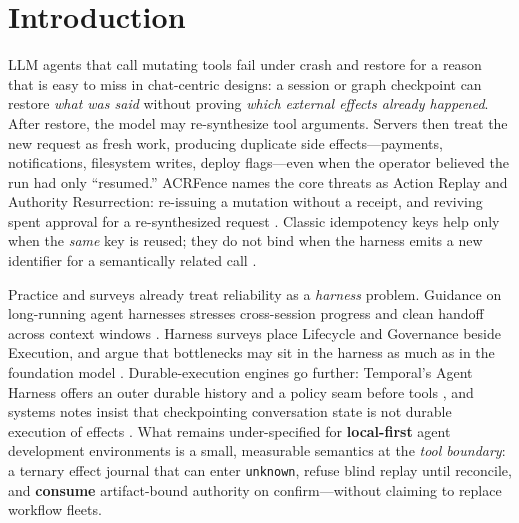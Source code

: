 \documentclass[11pt,a4paper]{article}
\begin{document}
\section{Introduction}
\label{sec:intro}

LLM agents that call mutating tools fail under crash and restore for a
reason that is easy to miss in chat-centric designs: a session or graph
checkpoint can restore \emph{what was said} without proving \emph{which
external effects already happened}. After restore, the model may
re-synthesize tool arguments. Servers then treat the new request as fresh
work, producing duplicate side effects---payments, notifications,
filesystem writes, deploy flags---even when the operator believed the run
had only ``resumed.'' ACRFence names the core threats as Action Replay and
Authority Resurrection: re-issuing a mutation without a receipt, and
reviving spent approval for a re-synthesized request
\cite{acrfence2026}. Classic idempotency keys help only when the
\emph{same} key is reused; they do not bind when the harness emits a new
identifier for a semantically related call \cite{beyondtokens2026}.

Practice and surveys already treat reliability as a \emph{harness}
problem. Guidance on long-running agent harnesses stresses cross-session
progress and clean handoff across context windows
\cite{anthropic2025harnesses}. Harness surveys place Lifecycle and
Governance beside Execution, and argue that bottlenecks may sit in the
harness as much as in the foundation model
\cite{li2026harnesssurvey,guo2026fromqa}. Durable-execution engines go
further: Temporal's Agent Harness offers an outer durable history and a
policy seam before tools \cite{temporal2026agentharness}, and systems
notes insist that checkpointing conversation state is not durable
execution of effects \cite{zylos2026durable}. What remains under-specified
for \textbf{local-first} agent development environments is a small,
measurable semantics at the \emph{tool boundary}: a ternary effect journal
that can enter \texttt{unknown}, refuse blind replay until reconcile, and
\textbf{consume} artifact-bound authority on confirm---without claiming to
replace workflow fleets.
\end{document}

